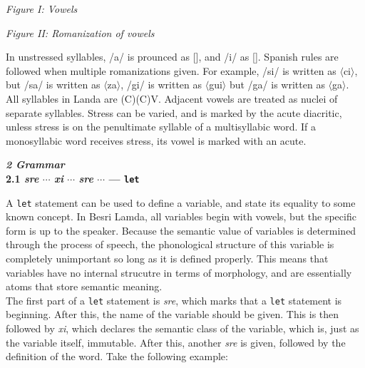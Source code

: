 \documentclass{article}[10pt]
\begin{document}
\begin{multicols}{2}
{\begin{center}
\emph{Figure I: Vowels}\\
 \Large
\begin{vowel}
\end{vowel} \end{center}}

{\begin{center}
\emph{Figure II: Romanization of vowels}\\
 \Large
\begin{vowel}
\end{vowel} \end{center}}
\end{multicols}

In unstressed syllables, /a/ is prounced as [], and /i/ as []. Spanish rules are followed when multiple romanizations given. For example, /si/ is written as $\langle$ci$\rangle$, but /sa/ is written as $\langle$za$\rangle$, /gi/ is written as $\langle$gui$\rangle$ but /ga/ is written as $\langle$ga$\rangle$. All syllables in Landa are (C)(C)V. Adjacent vowels are treated as nuclei of separate syllables. Stress can be varied, and is marked by the acute diacritic, unless stress is on the penultimate syllable of a multisyllabic word. If a monosyllabic word receives stress, its vowel is marked with an acute.

\clearpage
{\bf \emph{2 Grammar}}\\

{\bf 2.1 \emph{sre} $\cdots$ \emph{xi} $\cdots$ \emph{sre} $\cdots$ --- \texttt{let}}

A \texttt{let} statement can be used to define a variable, and state its equality to some known concept. In Besri Lamda, all variables begin with vowels, but the specific form is up to the speaker. Because the semantic value of variables is determined through the process of speech, the phonological structure of this variable is completely unimportant so long as it is defined properly. This means that variables have no internal strucutre in terms of morphology, and are essentially atoms that store semantic meaning.\\

The first part of a \texttt{let} statement is \emph{sre}, which marks that a \texttt{let} statement is beginning. After this, the name of the variable should be given. This is then followed by \emph{xi}, which declares the semantic class of the variable, which is, just as the  variable itself, immutable. After this, another \emph{sre} is given, followed by the definition of the word. Take the following example:
\end{document}
